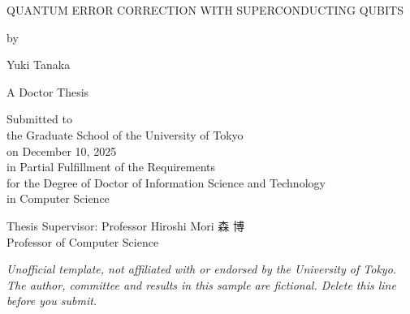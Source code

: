 \begin{titlepage}
\centering
\vspace*{\fill}
{\LARGE\MakeUppercase{Quantum Error Correction with Superconducting Qubits}\par}
\vspace{20pt}
by\par
\vspace{10pt}
{\large Yuki Tanaka}\par
\vspace{30pt}
A Doctor Thesis\par
\vspace{80pt}
Submitted to\\
the Graduate School of the University of Tokyo\\
on December 10, 2025\\
in Partial Fulfillment of the Requirements\\
for the Degree of Doctor of Information Science and Technology\\
in Computer Science\par
\vspace{20pt}
Thesis Supervisor: Professor Hiroshi Mori 森 博\\
Professor of Computer Science
\vspace*{\fill}
\par
{\footnotesize\itshape Unofficial template, not affiliated with or endorsed by the University of Tokyo. The author, committee and results in this sample are fictional. Delete this line before you submit.}
\end{titlepage}
